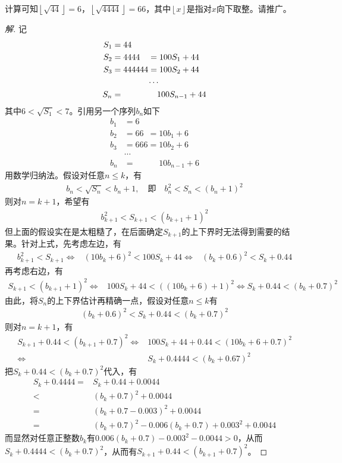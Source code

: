 \begin{example}
  计算可知$\left\lfloor\sqrt{44}\right\rfloor=6$，$\left\lfloor\sqrt{4444}\right\rfloor=66$，其中$\left\lfloor x\right\rfloor$是指对$x$向下取整。请推广。
\end{example}
\begin{proof}[解]
  记
  \begin{align*}
    S_1&=44\\
    S_2&=4444\phantom{44}=100S_1+44\\
    S_3&=444444=100S_2+44\\
    \multicolumn{2}{c}{$\cdots$}\\
    S_n&=\phantom{444444=}100S_{n-1}+44
  \end{align*}
  其中$6<\sqrt{S_1}<7$。引用另一个序列$b_n$如下
  \begin{align*}
    b_1&=6\\
    b_2&=66\phantom{6}=10b_1 + 6\\
    b_3&=666          =10b_2 + 6\\
       &\cdots\\
    b_n&=\phantom{666=}10b_{n-1} + 6
  \end{align*}
  用数学归纳法。假设对任意$n\le k$，有
  \begin{align*}
    b_n<\sqrt{S_n}<b_n+1,\quad\text{即}\quad b_n^2 < S_n < (b_n+1)^2
  \end{align*}
  则对$n=k+1$，希望有
  \begin{align*}
    b_{k+1}^2 < S_{k+1} < (b_{k+1}+1)^2
  \end{align*}
  但上面的假设实在是太粗糙了，在后面确定$S_{k+1}$的上下界时无法得到需要的结果。针对上式，先考虑左边，有
  \begin{align*}
    b_{k+1}^2 < S_{k+1} \iff & (10b_k + 6)^2 < 100S_k + 44
                        \iff & (b_k + 0.6) ^2 < S_k + 0.44
  \end{align*}
  再考虑右边，有
  \begin{align*}
    S_{k+1} < (b_{k+1}+1)^2 \iff & 100S_k+44 < \left((10b_k+6)+1\right)^2 \iff S_k + 0.44 < (b_k+0.7)^2
  \end{align*}
  由此，将$S_n$的上下界估计再精确一点，假设对任意$n\le k$有
  \begin{align*}
    (b_k+0.6)^2 <S_k+0.44<(b_k+0.7)^2
  \end{align*}
  则对$n=k+1$，有
  \begin{align*}
    S_{k+1} + 0.44 < (b_{k+1} + 0.7)^2 \iff & 100S_k + 44 + 0.44 < (10b_k + 6 + 0.7)^2 \\
    \iff & S_k + 0.4444 < (b_k + 0.67)^2
  \end{align*}
  把$S_k+0.44<(b_k+0.7)^2$代入，有
  \begin{align*}
    S_k+0.4444 = & S_k + 0.44 + 0.0044 \\
               < & (b_k+0.7)^2 + 0.0044\\
               = &(b_k + 0.7 - 0.003)^2 + 0.0044\\
               = & (b_k+0.7)^2 - 0.006(b_k+0.7) + 0.003^2 + 0.0044
  \end{align*}
  而显然对任意正整数$b_k$有$0.006(b_k+0.7) - 0.003^2 - 0.0044>0$，从而$S_k+0.4444 < (b_k+0.7)^2$，从而有$S_{k+1}+0.44<(b_{k+1}+0.7)^2$。


\end{proof}
